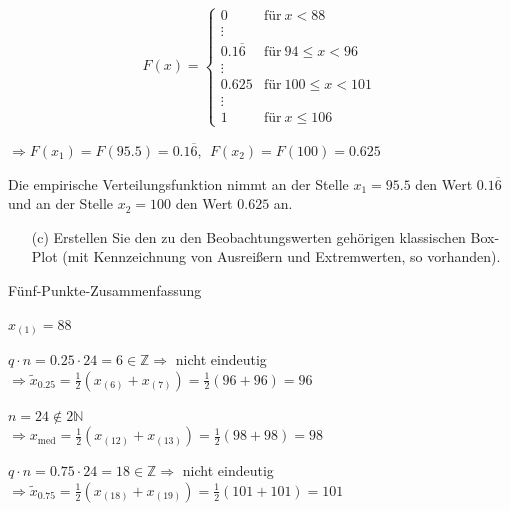 $$
F(x) = \begin{cases}
    0      & \text{für}~x<88 \\
    \vdots & \\
    0.1\overline{6} & \text{für}~94\le x<96 \\
    \vdots & \\
    0.625  & \text{für}~100\le x<101 \\
    \vdots & \\
    1      & \text{für}~x\le 106
\end{cases}
$$

$\Rightarrow F(x_1) = F(95.5) = 0.1\overline{6},~~F(x_2) = F(100) = 0.625$

Die empirische Verteilungsfunktion nimmt an der Stelle $x_1=95.5$ den Wert $0.1\overline{6}$ und an der Stelle $x_2=100$ den Wert $0.625$ an.


\begin{task}
    \begin{enumerate}
        \item[(c)] Erstellen Sie den zu den Beobachtungswerten gehörigen klassischen Box-Plot (mit Kennzeichnung von Ausreißern und Extremwerten, so vorhanden).
    \end{enumerate}
\end{task}

Fünf-Punkte-Zusammenfassung

$x_{(1)} = 88$

$q\cdot n = 0.25\cdot 24 = 6\in\mathbb{Z} \Rightarrow$ nicht eindeutig \\
$\Rightarrow \tilde{x}_{0.25} = \frac12(x_{(6)} + x_{(7)}) = \frac12(96+96) = 96$

$n = 24 \notin 2\mathbb{N}$ \\
$\Rightarrow x_{\operatorname{med}} = \frac12(x_{(12)} + x_{(13)}) = \frac12(98+98) = 98$

$q\cdot n = 0.75\cdot 24 = 18\in\mathbb{Z} \Rightarrow$ nicht eindeutig \\
$\Rightarrow \tilde{x}_{0.75} = \frac12(x_{(18)} + x_{(19)}) = \frac12(101+101) = 101$

